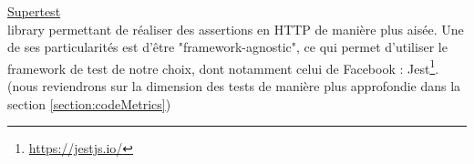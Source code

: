 \noindent\underline{\href{https://github.com/visionmedia/supertest}{Supertest}}\\

\Gls{library} permettant de réaliser des assertions en HTTP de manière plus aisée.
Une de ses particularités est d'être "framework-agnostic", ce qui permet d'utiliser le framework de test de notre choix, dont notamment celui de Facebook : Jest\footnote{
    \url{https://jestjs.io/}
}. (nous reviendrons sur la dimension des tests de manière plus approfondie dans la section \ref{section:codeMetrics})\\

\pagebreak
